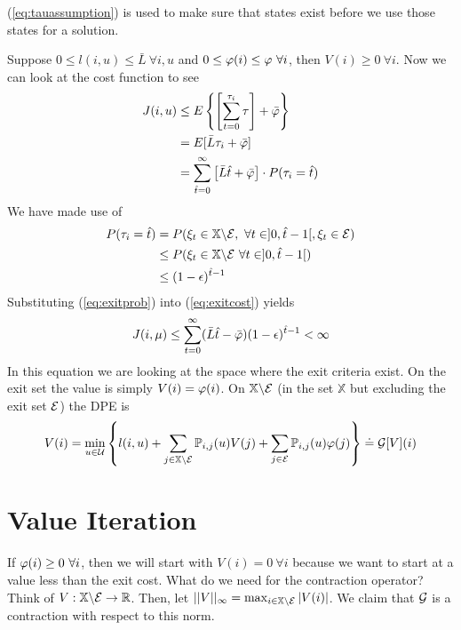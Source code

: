 (\ref{eq:tauassumption}) is used to make sure that states exist before we use those states for a solution.

Suppose $0\leq l(i,u)\leq \bar{L} ~\forall i,u$ and $0\leq \varphi(i) \leq \varphi ~\forall i$, then $V(i)\geq0 ~\forall i$. Now we can look at the cost function to see
\begin{align}
\label{eq:exitcost}
J(i,u) &\leq E\left\lbrace \left[\sum_{t=0}^{\tau_i}\tau\right] + \bar{\varphi}\right\rbrace \nonumber \\
&= E[\bar{L}\tau_i+\bar{\varphi}] \nonumber \\
&= \sum_{\hat{t}=0}^\infty\left[\bar{L}\hat{t}+\bar{\varphi}\right]\cdot P(\tau_i=\hat{t})
\end{align}
We have made use of
\begin{align}
\label{eq:exitprob}
P(\tau_i=\hat{t}) &= P(\xi_t\in\mathbb{X}\backslash\mathcal{E}, ~\forall t\in]0,\hat{t}-1[, \xi_t\in\mathcal{E}) \nonumber \\
&\leq P(\xi_t\in\mathbb{X}\backslash\mathcal{E} ~\forall t\in]0,\hat{t}-1[) \nonumber \\
&\leq (1-\epsilon)^{\hat{t}-1}
\end{align}
Substituting (\ref{eq:exitprob}) into (\ref{eq:exitcost}) yields
$$J(i,\mu) \leq \sum_{t=0}^\infty (\bar{L}\hat{t}-\bar{\varphi})(1-\epsilon)^{\hat{t}-1}<\infty$$
In this equation we are looking at the space where the exit criteria exist. On the exit set the value is simply $V(i)=\varphi(i)$. On $\mathbb{X}\backslash\mathcal{E}$ (in the set $\mathbb{X}$ but excluding the exit set $\mathcal{E}$) the DPE is
$$V(i) = \min_{u\in\mathcal{U}}\left\lbrace l(i,u) + \sum_{j\in\mathbb{X}\backslash\mathcal{E}}\mathbb{P}_{i,j}(u)V(j) + \sum_{j\in\mathcal{E}}\mathbb{P}_{i,j}(u)\varphi(j)\right\rbrace \doteq \mathcal{G}[V](i)$$

\section{Value Iteration}
If $\varphi(i)\geq0 ~\forall i$, then we will start with $V(i)=0 ~\forall i$ because we want to start at a value less than the exit cost. What do we need for the contraction operator? Think of $V:\mathbb{X}\backslash\mathcal{E}\to\mathbb{R}$. Then, let $||V||_\infty = \max_{i\in\mathbb{X}\backslash\mathcal{E}}|V(i)|$. We claim that $\mathcal{G}$ is a contraction with respect to this norm.

